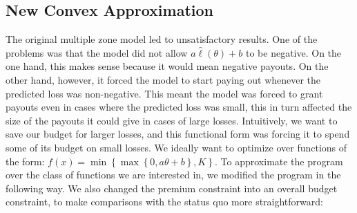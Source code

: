 \documentclass[11pt]{article}
\begin{document}
        

    \subsection{New Convex Approximation}
    The original multiple zone model led to unsatisfactory results. One of the problems was that the model did not allow $a\hat{\ell}(\theta)+b$ to be negative. On the one hand, this makes sense because it would mean negative payouts. On the other hand, however, it forced the model to start paying out whenever the predicted loss was non-negative. This meant the model was forced to grant payouts even in cases where the predicted loss was small, this in turn affected the size of the payouts it could give in cases of large losses. Intuitively, we want to save our budget for larger losses, and this functional form was forcing it to spend some of its budget on small losses. We ideally want to optimize over functions of the form: $f(x) = \min \left \{\max \left \{0,a\theta + b \right \}, K \right \}$. To approximate the program over the class of functions we are interested in, we modified the program in the following way. We also changed the premium constraint into an overall budget constraint, to make comparisons with the status quo more straightforward: 
    
\end{document}
